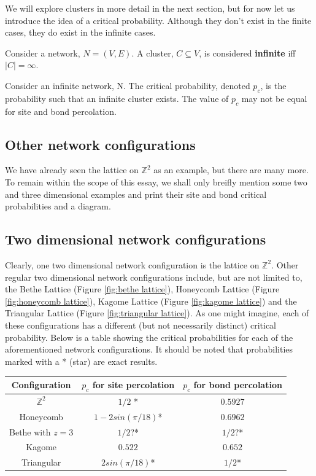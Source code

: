 We will explore clusters in more detail in the next section, but for now let us introduce the idea of a critical probability. Although they don't exist in the finite cases, they do
exist in the infinite cases.

\begin{definition}\label{def:infinite cluster}
  Consider a network, $N = (V, E)$. A cluster, $C \subseteq V$, is considered \textbf{infinite} iff $|C| = \infty$.
\end{definition}

\begin{definition}\label{def:critical probability}
  Consider an infinite network, N. The critical probability, denoted $p_c$, is the probability such that an infinite cluster exists. The value of $p_c$ may not  be equal for site
  and bond percolation.
\end{definition}

\newpage

\subsection{Other network configurations}
We have already seen the lattice on $\mathbb{Z}^2$ as an example, but there are many more. To remain within the scope of this essay, we shall only breifly mention some two and
three dimensional examples and print their site and bond critical probabilities and a diagram.

\cite[p. 11]{Sahimi}
\subsection*{Two dimensional network configurations}
Clearly, one two dimensional network configuration is the lattice on $\mathbb{Z}^2$. Other regular two dimensional network configurations include, but are not limited to, the Bethe Lattice (Figure \ref{fig:bethe lattice}), Honeycomb
Lattice (Figure \ref{fig:honeycomb lattice}), Kagome Lattice (Figure \ref{fig:kagome lattice}) and the Triangular Lattice (Figure \ref{fig:triangular lattice}). As one might
imagine, each of these configurations has a different (but not necessarily distinct) critical probability. Below is a table showing the critical probabilities for each of the
aforementioned network configurations. It should be noted that probabilities marked with a * (star) are exact results. \cite[p. 11]{Sahimi}

\begin{center}
\begin{tabular}{| c | c | c |}
    \hline
    Configuration & $p_c$ for site percolation & $p_c$ for bond percolation \\
    \hline
    $\mathbb{Z}^2$ & $1/2$ * & $0.5927$ \\
    Honeycomb & $1 - 2sin(\pi/18)$* & $0.6962$ \\
    Bethe with $z=3$ & $1/2$?* & $1/2$?* \\
    Kagome & $0.522$ & $0.652$ \\
    Triangular & $2sin(\pi/18)$* & $1/2$* \\
    \hline
  \end{tabular}
\end{center}

